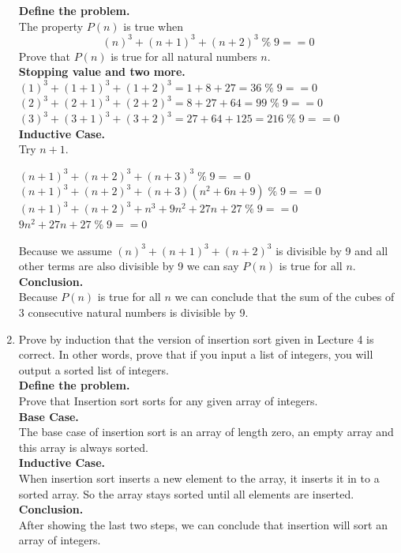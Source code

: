 \documentclass[a4paper]{article}
\begin{document}
\begin{enumerate}
    \textbf{Define the problem.} \\
    The property $P(n)$ is true when 
    $$(n)^{3}+(n+1)^{3}+(n+2)^{3} \; \% \; 9 == 0$$
    Prove that $P(n)$ is true for all natural numbers $n$. \\

    \textbf{Stopping value and two more.} \\
    $(1)^{3}+(1+1)^{3}+(1+2)^{3} = 1+8+27 = 36\; \% \; 9 == 0$ \\
    $(2)^{3}+(2+1)^{3}+(2+2)^{3} = 8+27+64 = 99\; \% \; 9 == 0$ \\
    $(3)^{3}+(3+1)^{3}+(3+2)^{3} = 27+64+125 = 216\; \% \; 9 == 0$ \\

    \textbf{Inductive Case.} \\ 
    Try $n+1$. 

    $(n+1)^{3}+(n+2)^{3}+(n+3)^{3} \; \% \; 9 == 0$ \\
    $(n+1)^{3}+(n+2)^{3}+(n+3)(n^{2}+6n+9) \; \% \; 9 == 0$ \\
    $(n+1)^{3}+(n+2)^{3}+n^{3}+9n^{2}+27n+27 \; \% \; 9 == 0$ \\
    $9n^{2}+27n+27 \; \% \; 9 == 0$ 
    
    Because we assume $(n)^{3}+(n+1)^{3}+(n+2)^{3}$ is divisible by 9 and all other
    terms are also divisible by 9 we can say $P(n)$ is true for all $n$. \\
 
    \textbf{Conclusion.} \\
    Because $P(n)$ is true for all $n$ we can conclude that the sum of the cubes of 
    3 consecutive natural numbers is divisible by 9.





    \newpage
    \item Prove by induction that the version of insertion sort given in Lecture
    4 is correct. In other words, prove that if you input a list of integers, you will
    output a sorted list of integers. \\

    \textbf{Define the problem.} \\
    Prove that Insertion sort sorts for any given array of integers. \\

    \textbf{Base Case.} \\
    The base case of insertion sort is an array of length zero, an empty array and this array
    is always sorted. \\

    \textbf{Inductive Case.} \\
    When insertion sort inserts a new element to the array, it inserts it in to a sorted
    array. So the array stays sorted until all elements are inserted. \\

    \textbf{Conclusion.} \\
    After showing the last two steps, we can conclude that insertion will sort an array
    of integers.



    \end{enumerate}
\end{document}

